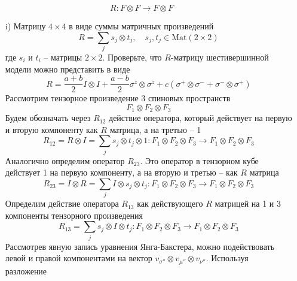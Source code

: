 \documentclass[12pt]{article}
\theoremstyle{definition}
\begin{document}
\begin{enumerate}
\begin{equation}
    \end{equation}
    \begin{equation}
        R:F\otimes F\rightarrow F\otimes F
    \end{equation}
    \begin{itemize}
        \item[i)] Матрицу $4\times4$ в виде суммы матричных произведений
        \begin{equation}
            R=\sum\limits_js_j\otimes t_j,\quad s_j,t_j\in\text{Mat}(2\times2)
        \end{equation}
        где $s_i$ и $t_i$ -- матрицы $2\times2$. Проверьте, что $R$-матрицу шестивершинной модели можно представить в виде
        \begin{equation}
            R=\frac{a+b}{2}I\otimes I+\frac{a-b}{2}\sigma^z\otimes\sigma^z+c(\sigma^+\otimes\sigma^-+\sigma^-\otimes\sigma^+)
        \end{equation}
        Рассмотрим тензорное произведение 3 спиновых пространств
        \begin{equation}
            F_1\otimes F_2\otimes F_3
        \end{equation}
        Будем обозначать через $R_{12}$ действие оператора, который действует на первую и вторую компоненту как $R$ матрица, а на третью -- 1
        \begin{equation}
            R_{12}=R\otimes I=\sum\limits_js_j\otimes t_j\otimes1:F_1\otimes F_2\otimes F_3\rightarrow F_1\otimes F_2\otimes F_3
        \end{equation}
        Аналогично определим оператор $R_{23}$. Это оператор в тензорном кубе действует 1 на первую компоненту, а на вторую и третью -- как $R$ матрица
        \begin{equation}
            R_{23}=I\otimes R=\sum\limits_jI\otimes s_j\otimes t_j:F_1\otimes F_2\otimes F_3\rightarrow F_1\otimes F_2\otimes F_3
        \end{equation}
        Определим действие оператора $R_{13}$ как действующего $R$ матрицей на 1 и 3 компоненты тензорного произведения
        \begin{equation}
            R_{13}=\sum\limits_js_j\otimes I\otimes t_j:F_1\otimes F_2\otimes F_3\rightarrow F_1\otimes F_2\otimes F_3
        \end{equation}
        Рассмотрев явную запись уравнения Янга-Бакстера, можно подействовать левой и правой компонентами на вектор $v_{\sigma''}\otimes v_{\mu''}\otimes v_{\nu''}$. Используя разложение
        \begin{equation}

\end{equation}
\end{itemize}
\end{enumerate}
\end{document}
